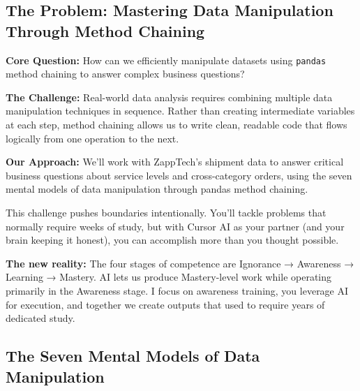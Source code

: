 \documentclass[
  letterpaper,
  DIV=11,
  numbers=noendperiod]{scrartcl}
\begin{document}
\subsection{The Problem: Mastering Data Manipulation Through Method
Chaining}\label{the-problem-mastering-data-manipulation-through-method-chaining}

\textbf{Core Question:} How can we efficiently manipulate datasets using
\texttt{pandas} method chaining to answer complex business questions?

\textbf{The Challenge:} Real-world data analysis requires combining
multiple data manipulation techniques in sequence. Rather than creating
intermediate variables at each step, method chaining allows us to write
clean, readable code that flows logically from one operation to the
next.

\textbf{Our Approach:} We'll work with ZappTech's shipment data to
answer critical business questions about service levels and
cross-category orders, using the seven mental models of data
manipulation through pandas method chaining.

\begin{tcolorbox}[enhanced jigsaw, toptitle=1mm, opacityback=0, colframe=quarto-callout-warning-color-frame, leftrule=.75mm, arc=.35mm, opacitybacktitle=0.6, breakable, titlerule=0mm, coltitle=black, bottomtitle=1mm, title=\textcolor{quarto-callout-warning-color}{\faExclamationTriangle}\hspace{0.5em}{⚠️ AI Partnership Required}, colbacktitle=quarto-callout-warning-color!10!white, rightrule=.15mm, left=2mm, bottomrule=.15mm, toprule=.15mm, colback=white]

This challenge pushes boundaries intentionally. You'll tackle problems
that normally require weeks of study, but with Cursor AI as your partner
(and your brain keeping it honest), you can accomplish more than you
thought possible.

\textbf{The new reality:} The four stages of competence are Ignorance →
Awareness → Learning → Mastery. AI lets us produce Mastery-level work
while operating primarily in the Awareness stage. I focus on awareness
training, you leverage AI for execution, and together we create outputs
that used to require years of dedicated study.

\end{tcolorbox}

\subsection{The Seven Mental Models of Data
Manipulation}\label{the-seven-mental-models-of-data-manipulation}
\end{document}
